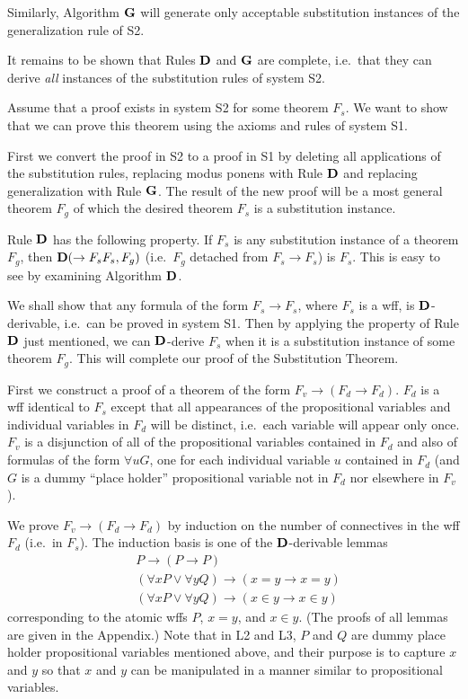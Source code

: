 \documentclass[leqno]{article}
\begin{document}
     Similarly, Algorithm ${\bf G}$ will generate only acceptable substitution
instances of the generalization rule of S2.

     It remains to be shown that Rules ${\bf D}$ and ${\bf G}$ are complete,
i.e.\ that they can derive {\em all} instances of the substitution rules of
system S2.

     Assume that a proof exists in system S2 for some theorem $F_s$.  We want
to show that we can prove this theorem using the axioms and rules of system
S1.

     First we convert the proof in S2 to a proof in S1 by deleting all
applications of the substitution rules, replacing modus ponens with Rule ${\bf
D}$ and replacing generalization with Rule ${\bf G}$.  The result of the new
proof will be a most general theorem $F_g$ of which the desired theorem $F_s$
is a substitution instance.

     Rule ${\bf D}$ has the following property.  If $F_s$ is any substitution
instance of a theorem $F_g$, then ${\bf D}(\rightarrow F_sF_s,F_g)$ (i.e.\
$F_g$ detached from $F_s\rightarrow F_s$) is $F_s$.  This is easy to see by
examining Algorithm ${\bf D}$.

     We shall show that any formula of the form $F_s\rightarrow F_s$, where
$F_s$ is a wff, is ${\bf D}$-derivable, i.e.\ can be proved in system S1.  Then
by applying the property of Rule ${\bf D}$ just mentioned, we can ${\bf
D}$-derive $F_s$ when it is a substitution instance of some theorem $F_g$.
This will complete our proof of the Substitution Theorem.

     First we construct a proof of a theorem of the form
$F_v\rightarrow (F_d\rightarrow F_d)$.  $F_d$ is a wff identical to $F_s$
except that all appearances of the propositional variables and individual
variables in $F_d$ will be distinct, i.e.\ each variable will appear only once.
$F_v$ is a disjunction of all of the propositional variables contained in
$F_d$ and also of formulas of the form $\forall uG$, one for each
individual variable $u$ contained in $F_d$ (and $G$ is a dummy ``place holder''
propositional variable not in $F_d$ nor elsewhere in $F_v$).

     We prove $F_v\rightarrow (F_d\rightarrow F_d)$ by induction on the number
of connectives in the wff $F_d$ (i.e.\ in $F_s$).  The induction basis is one
of the ${\bf D}$-derivable lemmas
\setcounter{equation}{0}
\renewcommand{\theequation}{L\arabic{equation}}
\begin{eqnarray} %
  & P\rightarrow (P\rightarrow P) \\
  & (\forall xP\vee \forall yQ)\rightarrow (x=y\rightarrow x=y) \\
  & (\forall xP\vee \forall yQ)\rightarrow (x\in y\rightarrow x\in y)
\end{eqnarray}
corresponding to the atomic wffs $P$, $x=y$, and $x\in y$.  (The proofs of
all lemmas are given in the Appendix.)  Note that in L2 and L3, $P$ and $Q$
are dummy place holder propositional variables mentioned above, and their
purpose is to capture $x$ and $y$ so that $x$ and $y$ can be manipulated in a
manner similar to propositional variables.
\end{document}

